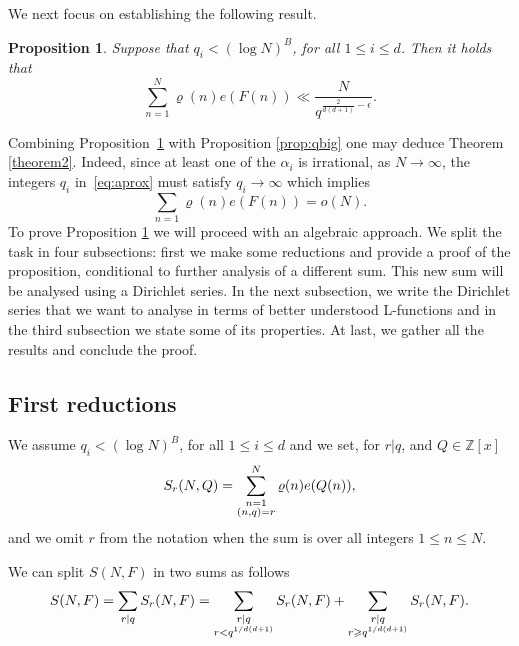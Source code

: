 \documentclass[12pt]{amsart}
\newtheorem{prop}{Proposition}
\def\Z{{\mathbb Z}}
\def\\{\cr}
\def\le{\leqslant}
\def\ge{\geqslant}
\begin{document}
We next focus on establishing the following result.

\begin{prop}
\label{prop:main}
Suppose that $q_i< (\log{N})^B$, for all $1\le i \le d$. Then it holds that
\begin{equation*}
\sum_{n=1}^N\varrho(n)e(F(n)) \ll \frac{N}{q^{ \frac{2}{d(d+1) } -\epsilon}}.
\end{equation*}
\end{prop}

Combining Proposition~\ref{prop:main} with Proposition \ref{prop:qbig} one may deduce Theorem \ref{theorem2}. Indeed, since at least one of the $\alpha_i$ is irrational, as $N\rightarrow \infty$, the integers $q_i$ in~\eqref{eq:aprox} must satisfy $q_i\rightarrow \infty$ which implies  \begin{equation*}
\sum_{n=1} \varrho(n)e(F(n)) = o(N).
\end{equation*}
To prove Proposition \ref{prop:main} we will proceed with an algebraic approach.  We split the task in four subsections: first we make some reductions and provide a proof of the proposition, conditional to further analysis of a different sum. This new sum will be analysed using a Dirichlet series. In the next subsection, we write the Dirichlet series that we want to analyse in terms of better understood L-functions and in the third subsection we state some of its properties. At last, we gather all the results and conclude the proof.

\subsection{First reductions}
We assume  $q_i< (\log{N})^B$, for all $1\le i \le d$ and we set, for $r|q$, and $Q \in \Z[x]$
\begin{align*}
S_r(N, Q) = \sum_{\substack{n=1 \\ (n,q)=r}}^N \varrho(n) e( Q(n)),
\end{align*}
and we omit $r$ from the notation when the sum is over all integers $1\le n \le N$.
 
We can split $S(N, F)$ in two sums as follows
 \begin{align}
 \label{eq:firstsplit}
 S(N,F) = \sum_{r|q} S_r(N,F) = \sum_{\substack{ r|q \\ r <q^{1/d(d+1)}}} S_r(N,F) + \sum_{\substack{ r|q \\ r \ge q^{1/d(d+1)}}} S_r(N,F).
 \end{align}
\end{document}
